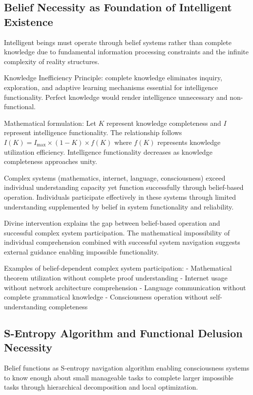 \documentclass[12pt,a4paper]{article}
\begin{document}
\subsection{Belief Necessity as Foundation of Intelligent Existence}

Intelligent beings must operate through belief systems rather than complete knowledge due to fundamental information processing constraints and the infinite complexity of reality structures.

Knowledge Inefficiency Principle: complete knowledge eliminates inquiry, exploration, and adaptive learning mechanisms essential for intelligence functionality. Perfect knowledge would render intelligence unnecessary and non-functional.

Mathematical formulation: Let $K$ represent knowledge completeness and $I$ represent intelligence functionality. The relationship follows $I(K) = I_{\text{max}} \times (1 - K) \times f(K)$ where $f(K)$ represents knowledge utilization efficiency. Intelligence functionality decreases as knowledge completeness approaches unity.

Complex systems (mathematics, internet, language, consciousness) exceed individual understanding capacity yet function successfully through belief-based operation. Individuals participate effectively in these systems through limited understanding supplemented by belief in system functionality and reliability.

Divine intervention explains the gap between belief-based operation and successful complex system participation. The mathematical impossibility of individual comprehension combined with successful system navigation suggests external guidance enabling impossible functionality.

Examples of belief-dependent complex system participation:
- Mathematical theorem utilization without complete proof understanding
- Internet usage without network architecture comprehension
- Language communication without complete grammatical knowledge
- Consciousness operation without self-understanding completeness

\subsection{S-Entropy Algorithm and Functional Delusion Necessity}

Belief functions as S-entropy navigation algorithm enabling consciousness systems to know enough about small manageable tasks to complete larger impossible tasks through hierarchical decomposition and local optimization.
\end{document}
